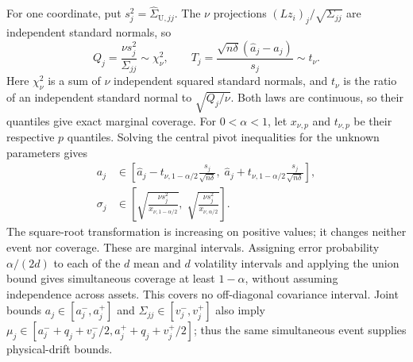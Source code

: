 \documentclass[11pt]{article}
\begin{document}
For one coordinate, put $s_j^2=\widehat\Sigma_{\mathrm U,jj}$.
The $\nu$ projections $(Lz_i)_j/\sqrt{\Sigma_{jj}}$ are independent
standard normals, so
\begin{equation}
 Q_j=\frac{\nu s_j^2}{\Sigma_{jj}}\sim\chi^2_\nu,
 \qquad
 T_j=\frac{\sqrt{n\delta}(\widehat a_j-a_j)}{s_j}
 \sim t_\nu.
 \label{eq:cgbm-exact-pivots}
\end{equation}
Here $\chi^2_\nu$ is a sum of $\nu$ independent squared standard
normals, and $t_\nu$ is the ratio of an independent standard normal
to $\sqrt{Q_j/\nu}$. Both laws are continuous, so their quantiles
give exact marginal coverage. For $0<\alpha<1$, let $x_{\nu,p}$ and
$t_{\nu,p}$ be their respective $p$ quantiles. Solving the central
pivot inequalities for the unknown parameters gives
\begin{align}
 a_j&\in\left[\widehat a_j-t_{\nu,1-\alpha/2}
 \frac{s_j}{\sqrt{n\delta}},\;
 \widehat a_j+t_{\nu,1-\alpha/2}
 \frac{s_j}{\sqrt{n\delta}}\right],
 \label{eq:cgbm-logdrift-ci}\\
 \sigma_j&\in\left[
 \sqrt{\frac{\nu s_j^2}{x_{\nu,1-\alpha/2}}},\;
 \sqrt{\frac{\nu s_j^2}{x_{\nu,\alpha/2}}}\right].
 \label{eq:cgbm-volatility-ci}
\end{align}
The square-root transformation is increasing on positive values;
it changes neither event nor coverage. These are marginal intervals. Assigning error probability
$\alpha/(2d)$ to each of the $d$ mean and $d$ volatility intervals
and applying the union bound gives simultaneous coverage at least
$1-\alpha$, without assuming independence across assets. This covers
no off-diagonal covariance interval. Joint bounds
$a_j\in[a_j^-,a_j^+]$ and $\Sigma_{jj}\in[v_j^-,v_j^+]$
also imply $\mu_j\in[a_j^-+q_j+v_j^-/2,a_j^++q_j+v_j^+/2]$;
thus the same simultaneous event supplies physical-drift bounds.
\end{document}
